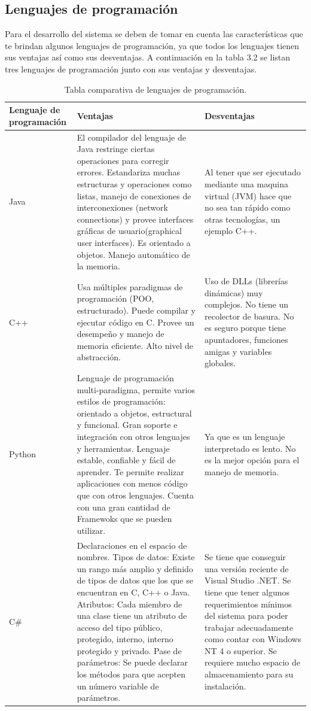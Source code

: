 \documentclass[12pt]{report}
\begin{document}
\subsection{Lenguajes de programación}
Para el desarrollo del sistema se deben de tomar en cuenta las características que te brindan algunos lenguajes de programación, ya que todos los lenguajes tienen sus ventajas así como sus desventajas. A continuación en la tabla 3.2 se listan tres lenguajes de programación junto con sus ventajas y desventajas.

\begin{table}[H]
\begin{center}
\begin{tabular}{|p{25mm}|p{60mm}|p{60mm}|}
\hline
Lenguaje de programación & Ventajas & Desventajas\\
\hline \hline 
Java & El compilador del lenguaje de Java  restringe ciertas operaciones para corregir errores. Estandariza muchas estructuras y operaciones como listas, manejo de conexiones de interconexiones (network connections) y provee interfaces gráficas de usuario(graphical user interfaces). Es orientado a objetos. Manejo automático de la memoria.\cite{java} & Al tener que ser ejecutado mediante una maquina virtual (JVM) hace que no sea tan rápido como  otras tecnologías, un ejemplo C++.\cite{java}\\
\hline
C++ & Usa múltiples paradigmas de programación (POO, estructurado). Puede compilar y ejecutar código en C. Provee un desempeño y manejo de memoria eficiente. Alto nivel de abstracción.\cite{cplus} & Uso de DLLs (librerías dinámicas) muy complejos. No tiene un recolector de basura. No es seguro porque tiene apuntadores, funciones amigas y variables globales.\cite{cplus}\\
\hline
Python & Lenguaje de programación multi-paradigma, permite varios estilos de programación: orientado a objetos, estructural y funcional.
Gran soporte e integración con otros lenguajes y herramientas.
Lenguaje estable, confiable y fácil de aprender.
Te permite realizar aplicaciones con menos código que con otros lenguajes. Cuenta con una gran cantidad de Framewoks que se pueden utilizar.\cite{vibora}
 & Ya que es un lenguaje interpretado es lento. No es la mejor opción para el manejo de memoria.\cite{vibora}\\
\hline
C\# & Declaraciones en el espacio de nombres. Tipos de datos: Existe un rango más amplio y definido de tipos de datos que los que se encuentran en C, C++ o Java. Atributos: Cada miembro de una clase tiene un atributo de acceso del tipo público, protegido, interno, interno protegido y privado. Pase de parámetros: Se puede declarar los métodos para que acepten un número variable de parámetros. & Se tiene que conseguir una versión reciente de Visual Studio .NET. Se tiene que tener algunos requerimientos mínimos del sistema para poder trabajar adecuadamente como contar con Windows NT 4 o superior. Se requiere mucho espacio de almacenamiento para su instalación. \cite{sisharp}
\end{tabular}
\caption{Tabla comparativa de lenguajes de programación.}
\end{center}
\end{table}
\end{document}
